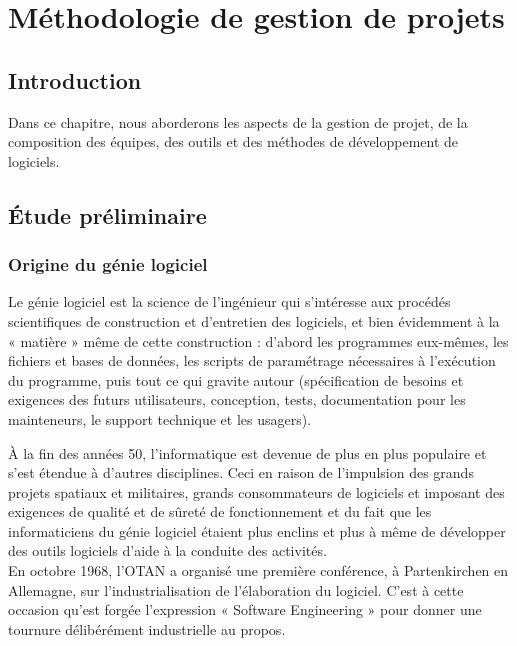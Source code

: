 \section{Méthodologie de gestion de projets}
\subsection*{Introduction}
Dans ce chapitre, nous aborderons les aspects de la gestion de projet, de la composition des équipes, des outils et des méthodes de développement de logiciels.
\subsection{Étude préliminaire}
\subsubsection{Origine du génie logiciel}
\begin{beware}[title=Définition : ]
Le génie logiciel est la science de l'ingénieur qui s'intéresse aux procédés scientifiques de construction et d'entretien des logiciels, et bien évidemment à la « matière » même de cette construction : d'abord les programmes eux-mêmes, les fichiers et bases de données, les scripts de paramétrage nécessaires à l'exécution du programme, puis tout ce qui gravite autour (spécification de besoins et exigences des futurs utilisateurs, conception, tests, documentation pour les mainteneurs, le support technique et les usagers)\cite{origine_gl1}.
\end{beware}

À la fin des années 50, l’informatique est devenue de plus en plus populaire et s’est étendue à d’autres disciplines. Ceci en raison de l’impulsion des grands projets spatiaux et militaires, grands consommateurs de logiciels et imposant des exigences de qualité et de sûreté de fonctionnement et du fait que les informaticiens du génie logiciel étaient plus enclins et plus à même de développer des outils logiciels d’aide à la conduite des activités.\\

En octobre 1968, l'OTAN a organisé une première conférence, à Partenkirchen en Allemagne, sur l’industrialisation de l’élaboration du logiciel. C’est à cette occasion qu'est forgée l’expression « Software Engineering » pour donner une tournure délibérément industrielle au propos\cite{origine_gl3}.\\

